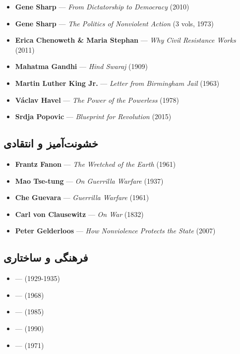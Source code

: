 \documentclass[a4paper,12pt]{article}
\begin{document}
\begin{itemize}[label=\textcolor{greenPrimary}{\faBook}, leftmargin=20pt]
  \item \textbf{Gene Sharp} — \textit{From Dictatorship to Democracy} (2010)
  \item \textbf{Gene Sharp} — \textit{The Politics of Nonviolent Action} (3 vols, 1973)
  \item \textbf{Erica Chenoweth \& Maria Stephan} — \textit{Why Civil Resistance Works} (2011)
  \item \textbf{Mahatma Gandhi} — \textit{Hind Swaraj} (1909)
  \item \textbf{Martin Luther King Jr.} — \textit{Letter from Birmingham Jail} (1963)
  \item \textbf{V\'{a}clav Havel} — \textit{The Power of the Powerless} (1978)
  \item \textbf{Srdja Popovic} — \textit{Blueprint for Revolution} (2015)
\end{itemize}

\subsection*{\textcolor{redPrimary}{\faFire} خشونت‌آمیز و انتقادی}

\begin{itemize}[label=\textcolor{redPrimary}{\faBook}, leftmargin=20pt]
  \item \textbf{Frantz Fanon} — \textit{The Wretched of the Earth} (1961)
  \item \textbf{Mao Tse-tung} — \textit{On Guerrilla Warfare} (1937)
  \item \textbf{Che Guevara} — \textit{Guerrilla Warfare} (1961)
  \item \textbf{Carl von Clausewitz} — \textit{On War} (1832)
  \item \textbf{Peter Gelderloos} — \textit{How Nonviolence Protects the State} (2007)
\end{itemize}

\subsection*{\textcolor{pinkPrimary}{\faTheaterMasks} فرهنگی و ساختاری}

\begin{itemize}[label=\textcolor{pinkPrimary}{\faBook}, leftmargin=20pt]
  \item \textbf{} — \textit{} (1929-1935)
  \item \textbf{} — \textit{} (1968)
  \item \textbf{} — \textit{} (1985)
  \item \textbf{} — \textit{} (1990)
  \item \textbf{} — \textit{} (1971)
\end{itemize}
\end{document}
